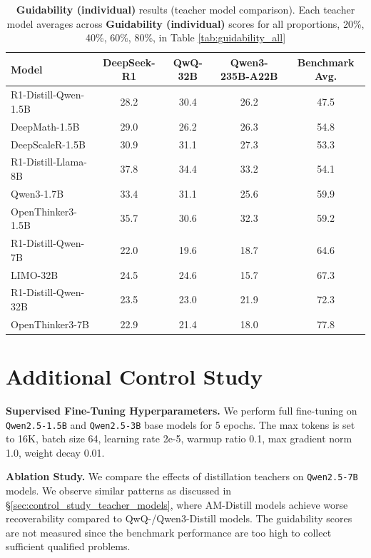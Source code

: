 \documentclass{article} %
\begin{document}
\begin{table}[ht]
  \centering
  \small
  \begin{tabular}{lccc|c}
    \toprule
    \textbf{Model} & \textbf{DeepSeek-R1} & \textbf{QwQ-32B} & \textbf{Qwen3-235B-A22B} & \textbf{Benchmark Avg.} \\
    \midrule
    R1-Distill-Qwen-1.5B    & 28.2 & 30.4 & 26.2 & 47.5 \\
    DeepMath-1.5B           & 29.0 & 26.2 & 26.3 & 54.8 \\
    DeepScaleR-1.5B         & 30.9 & 31.1 & 27.3 & 53.3 \\
    R1-Distill-Llama-8B     & 37.8 & 34.4 & 33.2 & 54.1 \\
    Qwen3-1.7B              & 33.4 & 31.1 & 25.6 & 59.9 \\
    OpenThinker3-1.5B       & 35.7 & 30.6 & 32.3 & 59.2 \\
    R1-Distill-Qwen-7B      & 22.0 & 19.6 & 18.7 & 64.6 \\
    LIMO-32B                & 24.5 & 24.6 & 15.7 & 67.3 \\
    R1-Distill-Qwen-32B     & 23.5 & 23.0 & 21.9 & 72.3 \\
    OpenThinker3-7B         & 22.9 & 21.4 & 18.0 & 77.8 \\
    \bottomrule
  \end{tabular}
  \caption{\textbf{Guidability (individual)} results (teacher model comparison). Each teacher model averages across \textbf{Guidability (individual)} scores for all proportions, 20\%, 40\%, 60\%, 80\%, in Table \ref{tab:guidability_all}}
  \label{tab:guidability_teacher_comparison}
\end{table}

\newpage


\section{Additional Control Study}
\label{sec:appendix_control_study}
\textbf{Supervised Fine-Tuning Hyperparameters.} We perform full fine-tuning on \texttt{Qwen2.5-1.5B} and \texttt{Qwen2.5-3B} base models for 5 epochs. The max tokens is set to 16K, batch size 64, learning rate 2e-5, warmup ratio 0.1, max gradient norm 1.0, weight decay 0.01.

\textbf{Ablation Study.} We compare the effects of distillation teachers on \texttt{Qwen2.5-7B} models. We observe similar patterns as discussed in \S \ref{sec:control_study_teacher_models}, where AM-Distill models achieve worse recoverability compared to QwQ-/Qwen3-Distill models. The guidability scores are not measured since the benchmark performance are too high to collect sufficient qualified problems.
\end{document}

